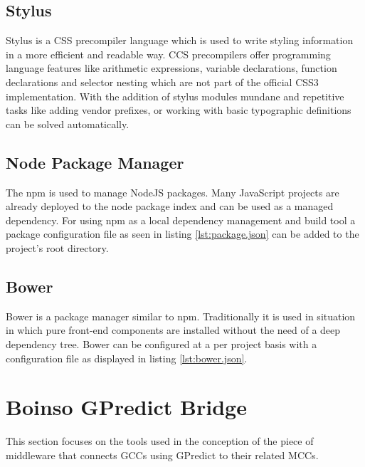\documentclass[BachelorPaper]{subfiles}
\begin{document}
\subsection{Stylus}
\label{subsec:mat_stylus}
Stylus is a \ac{CSS} precompiler language which is used to write styling information in a more efficient and readable way. \ac{CCS} precompilers offer programming language features like arithmetic expressions, variable declarations, function declarations and selector nesting which are not part of the official \ac{CSS}3 implementation. With the addition of stylus modules mundane and repetitive tasks like adding vendor prefixes, or working with basic typographic definitions can be solved automatically.

\subsection{Node Package Manager}
\label{subsec:mat_npm}
The \ac{npm} is used to manage NodeJS packages. Many JavaScript projects are already deployed to the node package index and can be used as a managed dependency. For using \ac{npm} as a local dependency management and build tool a package configuration file as seen in listing \ref{lst:package.json} can be added to the project's root directory.\\



\subsection{Bower}
\label{subsec:mat_bower}
Bower is a package manager similar to \ac{npm}. Traditionally it is used in situation in which pure front-end components are installed without the need of a deep dependency tree. Bower can be configured at a per project basis with a configuration file as displayed in listing \ref{lst:bower.json}.\\



\section{Boinso GPredict Bridge}
\label{sec:mat_boinso_bridge}
This section focuses on the tools used in the conception of the piece of middleware that connects \acp{GCC} using GPredict to their related \acp{MCC}.
\end{document}
